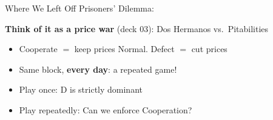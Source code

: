 
\newcommand{\stagegame}[1][]{%
\begin{matrixgame}[top={L, C, R}, left={T, M, B}, player names={Player 1, Player 2}, #1]
  \payoffmatrix{1,1 & 5,0 & 0,0 \\ 0,5 & 4,4 & 0,0 \\ 0,0 & 0,0 & 3,3}
\end{matrixgame}}

\newcommand{\pdgame}[1][]{%
\begin{matrixgame}[top={Cooperate, Defect}, left={Cooperate, Defect}, #1]
  \payoffmatrix{2,2 & 0,3 \\ 3,0 & 1,1}
\end{matrixgame}}



\frame{\maketitle}

\begin{frame}{Where We Left Off}
Prisoners' Dilemma:
\bsk
\centering
\pdgame
\bsk
\raggedright
\textbf{Think of it as a price war} (deck 03): Dos Hermanos vs.\ Pitabilities
\begin{itemize}
    \item Cooperate $=$ keep prices Normal. Defect $=$ cut prices
    \item Same block, \textbf{every day}: a repeated game!
\end{itemize}
\bsk
\begin{itemize}
    \item Play once: D is strictly dominant
    \item Play repeatedly: Can we enforce Cooperation?
\end{itemize}
\vspace{-0.3in}
\end{frame}

